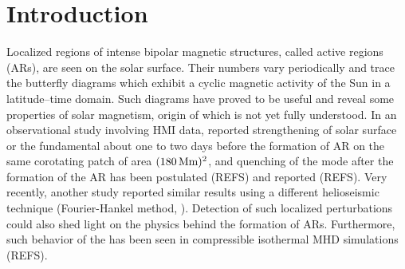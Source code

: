 \documentclass{aa}
\begin{document}

\maketitle

\section{Introduction} \label{sec:intro}

Localized regions of intense bipolar magnetic structures, called active regions
(ARs), are seen on the solar surface. Their numbers vary periodically and trace the
butterfly diagrams which exhibit a cyclic magnetic activity of the Sun in a latitude--time
domain. Such diagrams have proved to be useful and reveal some properties of solar
magnetism, origin of which is not yet fully understood.
In an observational study involving
HMI data, \cite{SRB16} reported strengthening of solar surface or the fundamental \fff
about one to two days before
the formation of AR on the same corotating patch of area $(180\, \Mm)^2$,
and quenching of the mode after the formation of the AR has been postulated
(REFS) and reported (REFS).
Very recently, another study reported similar results using a different
helioseismic technique (Fourier-Hankel method, \cite{Waidele22}).
Detection of such localized perturbations
could also shed light
on the physics behind the formation of ARs.
Furthermore, such behavior of the \fff has been seen in compressible
isothermal MHD simulations (REFS). 
\end{document}
